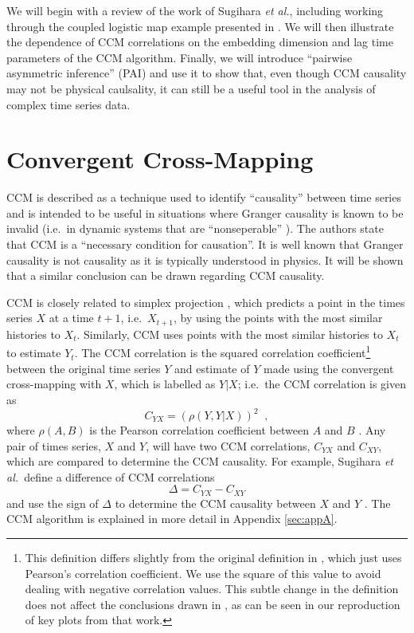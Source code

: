 \documentclass[a4paper,11pt]{article}
\begin{document}
We will begin with a review of the work of Sugihara {\em et al.}, including working through the coupled logistic map example presented in \cite{Sugihara2012}.  We will then illustrate the dependence of CCM correlations on the embedding dimension and lag time parameters of the CCM algorithm.  Finally, we will introduce ``pairwise asymmetric inference'' (PAI) and use it to show that, even though CCM causality may not be physical caulsality, it can still be a useful tool in the analysis of complex time series data.

\section{Convergent Cross-Mapping}
CCM is described as a technique used to identify ``causality'' between time series and is intended to be useful in situations where Granger causality is known to be invalid (i.e.\ in dynamic systems that are ``nonseperable'' \cite{Sugihara2012}).  The authors state that CCM is a ``necessary condition for causation''.  It is well known \cite{Granger1980,liu2012,Roberts1985} that Granger causality is not causality as it is typically understood in physics.  It will be shown that a similar conclusion can be drawn regarding CCM causality. 

CCM is closely related to simplex projection \cite{Sugihara1990,Sugihara1990a}, which predicts a point in the times series $X$ at a time $t+1$, i.e.\ $X_{t+1}$, by using the points with the most similar histories to $X_t$.  Similarly, CCM uses points with the most similar histories to $X_t$ to estimate $Y_t$.  The CCM correlation is the squared correlation coefficient\footnote{This definition differs slightly from the original definition in \cite{Sugihara2012}, which just uses Pearson’s correlation coefficient.  We use the square of this value to avoid dealing with negative correlation values.  This subtle change in the definition does not affect the conclusions drawn in \cite{Sugihara2012}, as can be seen in our reproduction of key plots from that work.} between the original time series $Y$ and estimate of $Y$ made using the convergent cross-mapping with $X$, which is labelled as $Y|X$; i.e.\ the CCM correlation is given as 
$$
C_{YX} = \left(\rho\left(Y,Y|X\right)\right)^2\;\;,
$$
where $\rho(A,B)$ is the Pearson correlation coefficient between $A$ and $B$ \cite{}.  Any pair of times series, $X$ and $Y$, will have two CCM correlations, $C_{YX}$ and $C_{XY}$, which are compared to determine the CCM causality.  For example, Sugihara {\em et al.\ }define a difference of CCM correlations
\begin{equation}
\label{eqn:delta}
\Delta = C_{YX} - C_{XY}
\end{equation}
and use the sign of $\Delta$ to determine the CCM causality between $X$ and $Y$ \cite{Sugihara2012}.  The CCM algorithm is explained in more detail in Appendix \ref{sec:appA}.
\end{document}
